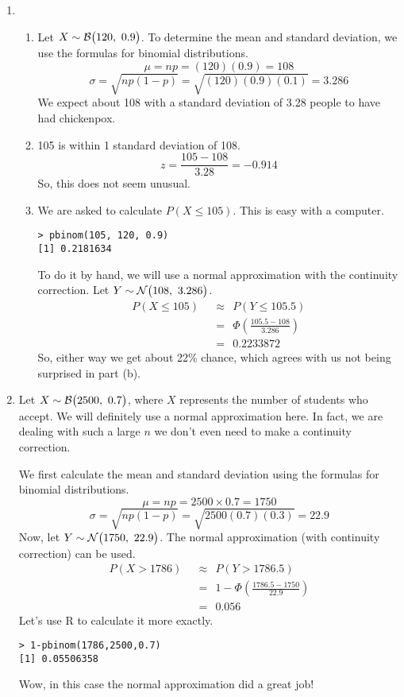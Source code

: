 \documentclass[12pt,letterpaper]{article}
\begin{document}
\begin{enumerate}
\newpage

\item \begin{enumerate}
\item Let $X\sim \mathcal{B}\big(120,~0.9\big)$. To determine the mean and standard deviation, we use the formulas for binomial distributions.
$$\mu = np = (120)(0.9) = 108 $$
$$\sigma = \sqrt{np(1-p)} = \sqrt{(120)(0.9)(0.1)} = 3.286 $$
We expect about 108 with a standard deviation of 3.28 people to have had chickenpox.
\item 105 is within 1 standard deviation of 108.
$$z = \frac{105-108}{3.28} = -0.914$$
So, this does not seem unusual.
\item We are asked to calculate $P(X\le 105)$. This is easy with a computer.
\begin{verbatim}
> pbinom(105, 120, 0.9)
[1] 0.2181634
\end{verbatim}
To do it by hand, we will use a normal approximation with the continuity correction. Let $Y\sim\mathcal{N}\big(108,~3.286\big)$.
\begin{align*}
P(X \le 105) ~~&\approx~~ P(Y \le 105.5)\\
 &=~~ \Phi\left(\frac{105.5-108}{3.286} \right)\\
 &=~~ 0.2233872
\end{align*}
So, either way we get about 22\% chance, which agrees with us not being surprised in part (b).
\end{enumerate}




\item Let $X\sim \mathcal{B}\big(2500,~0.7\big)$, where $X$ represents the number of students who accept. We will definitely use a normal approximation here. In fact, we are dealing with such a large $n$ we don't even need to make a continuity correction.

We first calculate the mean and standard deviation using the formulas for binomial distributions.
$$\mu = np = 2500 \times 0.7 = 1750 $$
$$\sigma = \sqrt{np(1-p)} = \sqrt{2500(0.7)(0.3)} = 22.9$$
Now, let $Y\sim \mathcal{N}\big(1750,~22.9\big)$. The normal approximation (with continuity correction) can be used.
\begin{align*}
P(X > 1786) ~~&\approx~~ P(Y > 1786.5)\\
 &=~~ 1-\Phi\left(\frac{1786.5-1750}{22.9} \right)\\
 &=~~ 0.056
\end{align*}
Let's use R to calculate it more exactly.
\begin{verbatim}
> 1-pbinom(1786,2500,0.7)
[1] 0.05506358
\end{verbatim}
Wow, in this case the normal approximation did a great job!



\end{enumerate}
\end{document}
